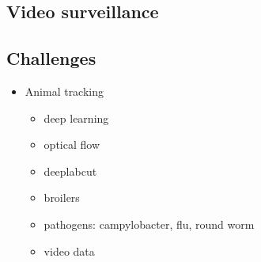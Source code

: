 \subsection{Video surveillance}

\subsection{Challenges}

\begin{itemize}
\item Animal tracking
\begin{itemize}
    \item deep learning
    \item optical flow
    \item deeplabcut
    \item broilers
    \item pathogens: campylobacter, flu, round worm
    \item video data
\end{itemize}
\end{itemize}
